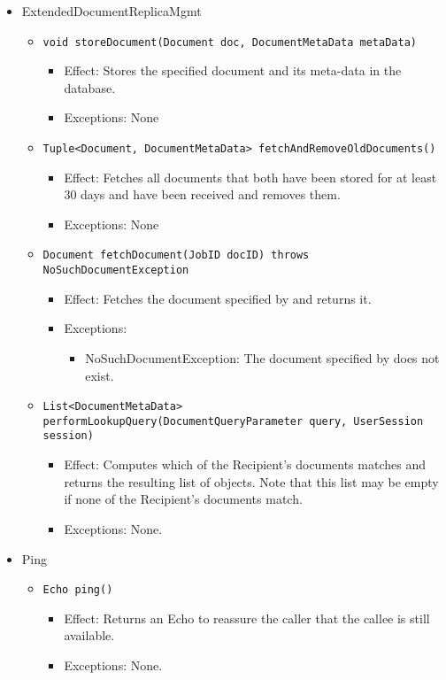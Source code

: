 \begin{itemize}
    \item ExtendedDocumentReplicaMgmt
	\begin{itemize}
		\item \texttt{void storeDocument(Document doc, DocumentMetaData metaData)}
		\begin{itemize}
			\item Effect: Stores the specified document and its meta-data in the database.
			\item Exceptions: None
		\end{itemize}

		\item \texttt{Tuple<Document, DocumentMetaData> fetchAndRemoveOldDocuments()}
		\begin{itemize}
			\item Effect: Fetches all documents that both have been stored for at least 30 days and have been received and removes them.
			\item Exceptions: None
		\end{itemize}

		\item \texttt{Document fetchDocument(JobID docID) throws NoSuchDocumentException}
		\begin{itemize}
			\item Effect: Fetches the document specified by  and returns it.
			\item Exceptions:
			\begin{itemize}
				\item NoSuchDocumentException: The document specified by  does not exist.
			\end{itemize}
		\end{itemize}
				
		\item \texttt{List<DocumentMetaData> performLookupQuery(DocumentQueryParameter query, UserSession session)}
		\begin{itemize}
			\item Effect: Computes which of the Recipient's documents matches  and returns the resulting list of  objects. Note that this list may be empty if none of the Recipient's documents match.
			\item Exceptions: None.
		\end{itemize}
	\end{itemize}

	\item Ping
	\begin{itemize}
		\item \texttt{Echo ping()}
		\begin{itemize}
			\item Effect: Returns an Echo to reassure the caller that the callee is still available.
			\item Exceptions: None.
		\end{itemize}
	\end{itemize}
\end{itemize}

